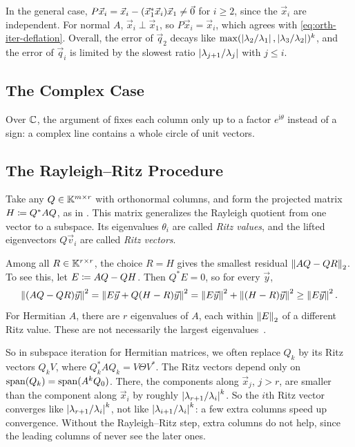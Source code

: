 In the general case, $P\vec{x}_i = \vec{x}_i - (\vec{x}_1^\ast\vec{x}_i)\vec{x}_1 \ne \vec{0}$ for $i \ge 2$, since the $\vec{x}_i$ are independent. For normal $A$, $\vec{x}_i \perp \vec{x}_1$, so $P\vec{x}_i = \vec{x}_i$, which agrees with \cref{eq:orth-iter-deflation}. Overall, the error of $\vec{q}_2$ decays like $\max(\left\lvert \lambda_2/\lambda_1 \right\rvert, \left\lvert \lambda_3/\lambda_2 \right\rvert)^k$, and the error of $\vec{q}_i$ is limited by the slowest ratio $\left\lvert \lambda_{j+1}/\lambda_j \right\rvert$ with $j \le i$.

\subsection{The Complex Case}

Over $\mathbb{C}$, the argument of  fixes each column only up to a factor $e^{\mathrm{i}\theta}$ instead of a sign: a complex line contains a whole circle of unit vectors.

\subsection{The Rayleigh--Ritz Procedure}

Take any $Q \in \mathbb{K}^{m \times r}$ with orthonormal columns, and form the projected matrix $H \coloneqq Q^\ast AQ$, as in . This matrix generalizes the Rayleigh quotient from one vector to a subspace. Its eigenvalues $\theta_i$ are called \emph{Ritz values}, and the lifted eigenvectors $Q\vec{v}_i$ are called \emph{Ritz vectors}.

Among all $R \in \mathbb{K}^{r \times r}$, the choice $R = H$ gives the smallest residual $\left\lVert AQ - QR \right\rVert_2$. To see this, let $E \coloneqq AQ - QH$. Then $Q^\ast E = 0$, so for every $\vec{y}$,
\begin{equation}
  \left\lVert (AQ - QR)\vec{y} \right\rVert^2 = \left\lVert E\vec{y} + Q(H - R)\vec{y} \right\rVert^2 = \left\lVert E\vec{y} \right\rVert^2 + \left\lVert (H - R)\vec{y} \right\rVert^2 \ge \left\lVert E\vec{y} \right\rVert^2.
\end{equation}
For Hermitian $A$, there are $r$ eigenvalues of $A$, each within $\left\lVert E \right\rVert_2$ of a different Ritz value. These are not necessarily the largest eigenvalues~\cite[\S7.2]{Demmel}.

So in subspace iteration for Hermitian matrices, we often replace $Q_k$ by its Ritz vectors $Q_kV$, where $Q_k^\ast AQ_k = V\Theta V^\ast$. The Ritz vectors depend only on $\operatorname{span}(Q_k) = \operatorname{span}(A^kQ_0)$. There, the components along $\vec{x}_j$, $j > r$, are smaller than the component along $\vec{x}_i$ by roughly $\left\lvert \lambda_{r+1}/\lambda_i \right\rvert^k$. So the $i$th Ritz vector converges like $\left\lvert \lambda_{r+1}/\lambda_i \right\rvert^k$, not like $\left\lvert \lambda_{i+1}/\lambda_i \right\rvert^k$: a few extra columns speed up convergence. Without the Rayleigh--Ritz step, extra columns do not help, since the leading columns of  never see the later ones.

